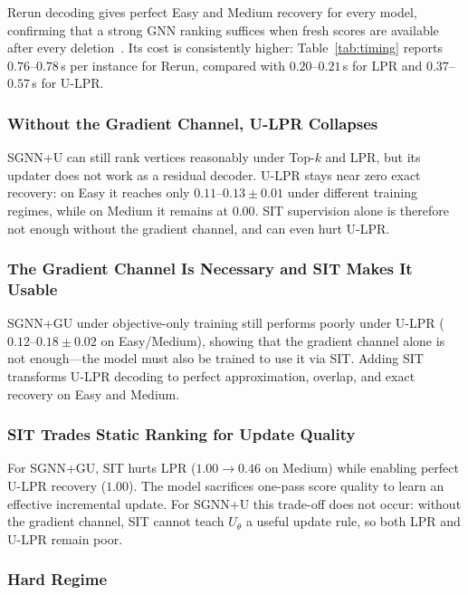 \documentclass[journal,article,submit,pdftex,moreauthors]{Definitions/mdpi}
\begin{document}
Rerun decoding gives perfect Easy and Medium recovery for every model, confirming
that a strong GNN ranking suffices when fresh scores are available after every
deletion~\citep{shoham2026ltr}. Its cost is consistently higher:
Table~\ref{tab:timing} reports $0.76$--$0.78$\,s per instance for Rerun, compared
with $0.20$--$0.21$\,s for LPR and $0.37$--$0.57$\,s for U-LPR.

\subsubsection{Without the Gradient Channel, U-LPR Collapses}

SGNN+U can still rank vertices reasonably under Top-$k$ and LPR, but its updater
does not work as a residual decoder. U-LPR stays near zero exact recovery: on Easy
it reaches only $0.11$--$0.13{\pm}0.01$ under different training regimes, while on
Medium it remains at $0.00$. SIT supervision alone is therefore not enough without
the gradient channel, and can even hurt U-LPR.

\subsubsection{The Gradient Channel Is Necessary and SIT Makes It Usable}

SGNN+GU under objective-only training still performs poorly under U-LPR
($0.12$--$0.18{\pm}0.02$ on Easy/Medium), showing that the gradient channel alone
is not enough---the model must also be trained to use it via SIT. Adding SIT
transforms U-LPR decoding to perfect approximation, overlap, and exact recovery on
Easy and Medium.

\subsubsection{SIT Trades Static Ranking for Update Quality}

For SGNN+GU, SIT hurts LPR ($1.00\to0.46$ on Medium) while enabling perfect U-LPR
recovery ($1.00$). The model sacrifices one-pass score quality to learn an effective
incremental update. For SGNN+U this trade-off does not occur: without the gradient
channel, SIT cannot teach $U_\theta$ a useful update rule, so both LPR and U-LPR
remain poor.

\subsubsection{Hard Regime}
\end{document}

